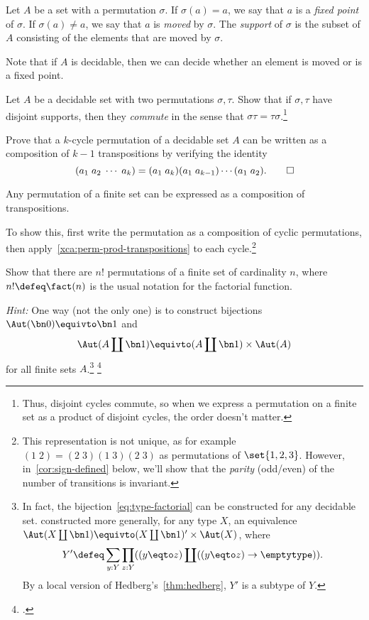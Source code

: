 \begin{definition}\label{def:support-permutation}
  Let $A$ be a set with a permutation $\sigma$.
  If $\sigma(a)=a$, we say that $a$ is a \emph{fixed point} of $\sigma$.
  If $\sigma(a)\ne a$, we say that $a$ is \emph{moved} by $\sigma$.
  The \emph{support} of $\sigma$ is the subset of $A$
  consisting of the elements that are moved by $\sigma$.
\end{definition}
Note that if $A$ is decidable, then we can decide whether an element is moved or is a fixed point.

\begin{xca}
  Let $A$ be a decidable set with two permutations $\sigma,\tau$.
  Show that if $\sigma,\tau$ have disjoint supports,
  then they \emph{commute} in the sense that $\sigma\tau=\tau\sigma$.\footnote{%
    Thus, disjoint cycles commute, so when we express a permutation
    on a finite set as a product of disjoint cycles, the order doesn't matter.}
\end{xca}
\begin{xca}\label{xca:perm-prod-transpositions}
  Prove that a $k$-cycle permutation of a decidable set $A$ can be written
  as a composition of $k-1$ transpositions by verifying the identity
  \[
    (a_1\; a_2\; \cdots\; a_k) = (a_1\; a_k)(a_1\;a_{k-1})\cdots(a_1\;a_2).
    \qedhere
  \]
\end{xca}
\begin{corollary}
  Any permutation of a finite set can be expressed as
  a composition of transpositions.
\end{corollary}
To show this, first write the permutation as a composition of cyclic permutations,
then apply~\cref{xca:perm-prod-transpositions} to each cycle.\footnote{%
  This representation is not unique, as for example $(1\;2)=(2\;3)(1\;3)(2\;3)$
  as permutations of $\set{1,2,3}$.
  However, in~\cref{cor:sign-defined} below, we'll show that
  the \emph{parity} (odd/even) of the number of transitions is invariant.}

\begin{xca}\label{xca:factorial}
  Show that there are $n!$ permutations of a finite set of cardinality $n$, where $n! \defeq \fact(n)$ is the usual notation for the factorial function.

  \emph{Hint:} One way (not the only one) is to construct bijections
  $\Aut(\bn 0) \equivto \bn 1$ and
  \begin{equation}\label{eq:type-factorial}
    \Aut(A \coprod \bn 1) \equivto (A \coprod \bn 1) \times \Aut(A)
  \end{equation}
  for all finite sets $A$.\footnote{%
    In fact, the bijection~\eqref{eq:type-factorial}
    can be constructed for any decidable set.
    \citeauthor{EscardoFactorial}\footnotemark{} constructed more generally,
    for any type $X$, an equivalence
    $\Aut(X \coprod \bn 1) \equivto (X \coprod \bn 1)' \times \Aut(X)$,
    where
    \[
      Y' \defeq
      \sum_{y : Y}\prod_{z : Y}((y \eqto z) \coprod ((y \eqto z)\to\emptytype)).
    \]
    By a local version of Hedberg's~\cref{thm:hedberg},
    $Y'$ is a subtype of $Y$.}%
  \footcitetext{EscardoFactorial}
\end{xca}

